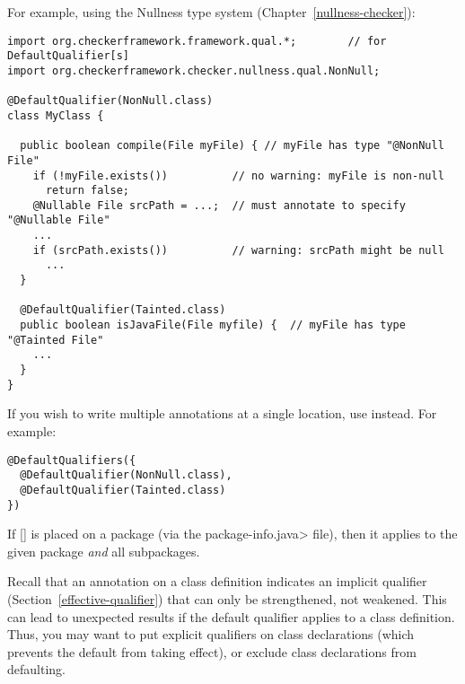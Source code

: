 For example, using the Nullness type system (Chapter~\ref{nullness-checker}):

\begin{Verbatim}
import org.checkerframework.framework.qual.*;        // for DefaultQualifier[s]
import org.checkerframework.checker.nullness.qual.NonNull;

@DefaultQualifier(NonNull.class)
class MyClass {

  public boolean compile(File myFile) { // myFile has type "@NonNull File"
    if (!myFile.exists())          // no warning: myFile is non-null
      return false;
    @Nullable File srcPath = ...;  // must annotate to specify "@Nullable File"
    ...
    if (srcPath.exists())          // warning: srcPath might be null
      ...
  }

  @DefaultQualifier(Tainted.class)
  public boolean isJavaFile(File myfile) {  // myFile has type "@Tainted File"
    ...
  }
}
\end{Verbatim}

If you wish to write multiple
 annotations at a single location,
use
 instead.  For example:

\begin{Verbatim}
@DefaultQualifiers({
  @DefaultQualifier(NonNull.class),
  @DefaultQualifier(Tainted.class)
})
\end{Verbatim}


If [] is placed on a package (via the
\<package-info.java> file), then it applies to the given package \emph{and}
all subpackages.

Recall that an annotation on a class definition indicates an implicit
qualifier (Section~\ref{effective-qualifier}) that can only be
strengthened, not weakened.  This can lead to unexpected results if
the default qualifier applies to a class definition.  Thus, you may want to
put explicit qualifiers on class declarations (which prevents the default
from taking effect), or exclude class declarations from defaulting.




